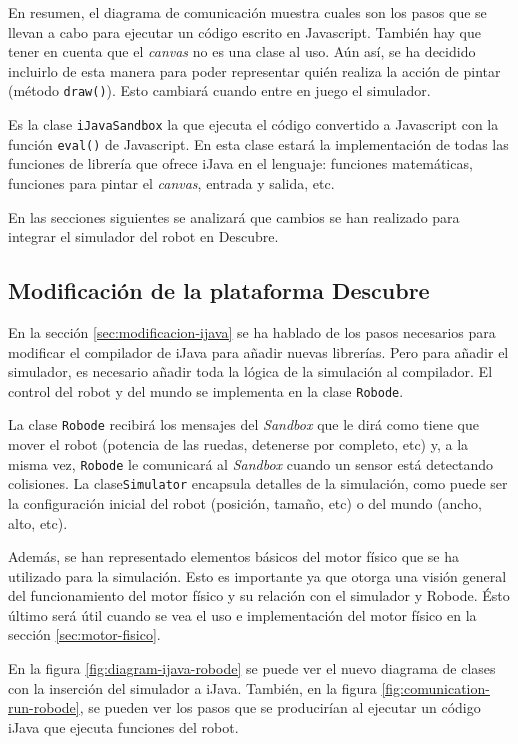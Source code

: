 En resumen, el diagrama de comunicación muestra cuales son los pasos que se llevan a cabo para ejecutar un código escrito en Javascript. También hay que tener en cuenta que el \emph{canvas} no es una clase al uso. Aún así, se ha decidido incluirlo de esta manera para poder representar quién realiza la acción de pintar (método \texttt{draw()}). Esto cambiará cuando entre en juego el simulador.

Es la clase \texttt{iJavaSandbox} la que ejecuta el código convertido a Javascript con la función \texttt{eval()} de Javascript. En esta clase estará la implementación de todas las funciones de librería que ofrece iJava en el lenguaje: funciones matemáticas, funciones para pintar el \emph{canvas}, entrada y salida, etc.

En las secciones siguientes se analizará que cambios se han realizado para integrar el simulador del robot en Descubre.

\subsection{Modificación de la plataforma Descubre}
\label{sec:modificacion-descubre}


En la sección \ref{sec:modificacion-ijava} se ha hablado de los pasos necesarios para modificar el compilador de iJava para añadir nuevas librerías. Pero para añadir el simulador, es necesario añadir toda la lógica de la simulación al compilador. El control del robot y del mundo se implementa en la clase \texttt{Robode}.

La clase \texttt{Robode} recibirá los mensajes del \emph{Sandbox} que le dirá como tiene que mover el robot (potencia de las ruedas, detenerse por completo, etc) y, a la misma vez, \texttt{Robode} le comunicará al \emph{Sandbox} cuando un sensor está detectando colisiones. La clase\texttt{Simulator} encapsula detalles de la simulación, como puede ser la configuración inicial del robot (posición, tamaño, etc) o del mundo (ancho, alto, etc). 

Además, se han representado elementos básicos del motor físico que se ha utilizado para la simulación. Esto es importante ya que otorga una visión general del funcionamiento del motor físico y su relación con el simulador y Robode. Ésto último será útil cuando se vea el uso e implementación del motor físico en la sección \ref{sec:motor-fisico}.

En la figura \ref{fig:diagram-ijava-robode} se puede ver el nuevo diagrama de clases con la inserción del simulador a iJava. También, en la figura \ref{fig:comunication-run-robode}, se pueden ver los pasos que se producirían al ejecutar un código iJava que ejecuta funciones del robot. 


